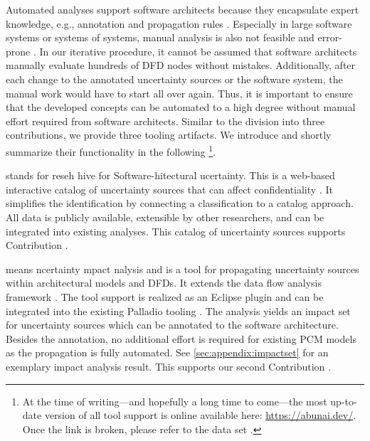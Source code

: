Automated analyses support software architects because they encapsulate expert knowledge, e.g., annotation and propagation rules \cite{hahner_classification_2023}.
Especially in large software systems or systems of systems, manual analysis is also not feasible and error-prone \cite{seifermann_data-driven_2019}.
In our iterative procedure, it cannot be assumed that software architects manually evaluate hundreds of \ac{DFD} nodes \cite{hahner_classification_2023} without mistakes.
Additionally, after each change to the annotated uncertainty sources or the software system, the manual work would have to start all over again.
Thus, it is important to ensure that the developed concepts can be automated to a high degree without manual effort required from software architects.
Similar to the division into three contributions, we provide three tooling artifacts.
We introduce and shortly summarize their functionality in the following%
\footnote{At the time of writing---and hopefully a long time to come---the most up-to-date version of all tool support is online available here: \url{https://abunai.dev/}. Once the link is broken, please refer to the data set \cite{dataset}.}.

\arcen stands for reseh hive for Software-hitectural ucertainty.
This is a web-based interactive catalog of uncertainty sources that can affect confidentiality \cite{hahner_arcn_2024}.
It simplifies the identification by connecting a classification \cite{hahner_classification_2023} to a catalog approach.
All data is publicly available, extensible by other researchers, and can be integrated into existing analyses.
This catalog of uncertainty sources supports Contribution .

\uia means ncertainty mpact nalysis and is a tool for propagating uncertainty sources within architectural models and \acp{DFD}.
It extends the data flow analysis framework \cite{boltz_extensible_2024}.
The tool support is realized as an Eclipse plugin and can be integrated into the existing Palladio tooling \cite{reussner_modeling_2016}.
The analysis yields an impact set for uncertainty sources which can be annotated to the software architecture.
Besides the annotation, no additional effort is required for existing \ac{PCM} models as the propagation is fully automated.
See \autoref{sec:appendix:impactset} for an exemplary impact analysis result.
This supports our second Contribution .

